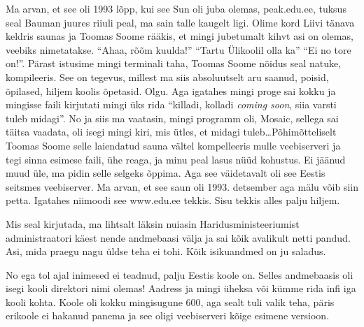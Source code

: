 Ma arvan, et see oli 1993 lõpp, kui see Sun oli juba olemas, peak.edu.ee,  tuksus seal Bauman juures  riiuli peal, ma sain talle kaugelt ligi. Olime kord  Liivi tänava keldris saunas ja Toomas Soome rääkis, et  mingi jubetumalt kihvt asi on olemas, veebiks nimetatakse. \enquote{Ahaa, rõõm kuulda!} \enquote{Tartu Ülikoolil olla ka} \enquote{Ei no tore on!}. Pärast istusime mingi terminali taha, Toomas Soome nõidus seal natuke, kompileeris. See on tegevus, millest ma siis absoluutselt aru saanud, poisid, õpilased, hiljem koolis õpetasid. Olgu. Aga igatahes mingi proge sai  kokku ja  mingisse faili kirjutati mingi üks rida  \enquote{killadi, kolladi \emph{coming soon}, siia varsti tuleb midagi}. No ja siis ma vaatasin, mingi programm oli, Mosaic, sellega sai täitsa vaadata, oli isegi mingi kiri, mis ütles, et midagi tuleb\ldots Põhimõtteliselt Toomas Soome selle laiendatud sauna vältel kompelleeris mulle veebiserveri ja tegi sinna esimese faili, ühe reaga, ja minu  peal  lasus nüüd kohustus. Ei jäänud muud üle, ma pidin selle selgeks õppima. Aga see väidetavalt oli see Eestis seitsmes veebiserver. Ma arvan, et see saun oli 1993. detsember aga mälu võib siin petta. Igatahes niimoodi see www.edu.ee tekkis. Sisu tekkis alles palju hiljem.


Mis seal kirjutada, ma lihtsalt läksin nuiasin Haridusministeeriumist administraatori käest nende andmebaasi välja ja sai kõik avalikult netti pandud. Asi, mida praegu nagu üldse teha ei tohi. Kõik isikuandmed on ju saladus.


No ega tol ajal inimesed ei teadnud, palju Eestis koole on. Selles andmebaasis oli isegi kooli direktori nimi olemas! Aadress ja mingi üheksa või kümme rida infi iga kooli kohta. Koole oli kokku mingisugune 600, aga sealt tuli  valik teha, päris erikoole ei hakanud panema ja see oligi veebiserveri kõige esimene versioon. 

